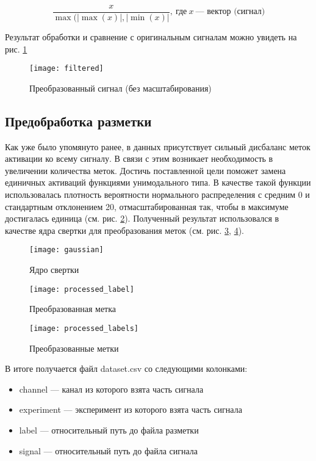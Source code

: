\begin{equation} \label{eq:scaling}
	\frac{x}{\max(|\max(x)|, |\min(x)|}, \: \text{где} \: x \: \text{--- вектор (сигнал)}
\end{equation}

\noindent Результат обработки и сравнение с оригинальным сигналам можно увидеть
на рис. \ref{fig:filtered}

\begin{figure}[!htb]
	\centering
	\caption{Преобразованный сигнал (без масштабирования)}
	\texttt{[image: filtered]}
	\label{fig:filtered}
\end{figure}

\subsection{Предобработка разметки} Как уже было упомянуто ранее, в данных
присутствует сильный дисбаланс меток активации ко всему сигналу. В связи с этим
возникает необходимость в увеличении количества меток. Достичь поставленной
цели поможет замена единичных активаций функциями унимодального типа. В
качестве такой функции использовалась плотность вероятности нормального
распределения с средним 0 и стандартным отклонением 20, отмасштабированная так,
чтобы в максимуме достигалась единица (см. рис. \ref{fig:gaussian}). Полученный
результат использовался в качестве ядра свертки для преобразования меток (см.
рис. \ref{fig:processed-label}, \ref{fig:processed-labels}).


\begin{figure}[!htb]
	\centering
	\caption{Ядро свертки}
	\texttt{[image: gaussian]}
	\label{fig:gaussian}
\end{figure}

\begin{figure}[!htb]
	\centering
	\caption{Преобразованная метка}
	\texttt{[image: processed\_label]}
	\label{fig:processed-label}
\end{figure}

\begin{figure}[!htb]
	\centering
	\caption{Преобразованные метки}
	\texttt{[image: processed\_labels]}
	\label{fig:processed-labels}
\end{figure}


В итоге получается файл dataset.csv со следующими колонками:

\begin{itemize}
	\item channel --- канал из которого взята часть сигнала
	\item experiment --- эксперимент из которого взята часть сигнала
	\item label --- относительный путь до файла разметки
	\item signal --- относительный путь до файла сигнала
\end{itemize}
